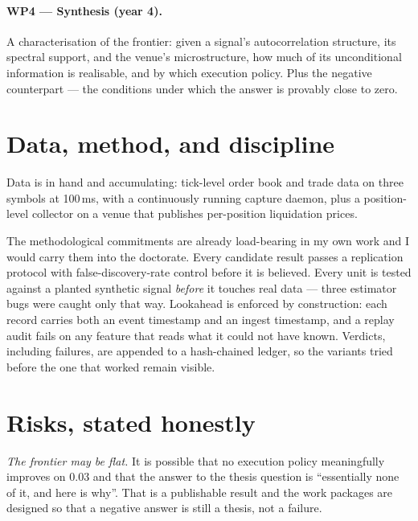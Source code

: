 \documentclass[11pt,a4paper]{article}
\begin{document}
\paragraph{WP4 --- Synthesis (year 4).} A characterisation of the frontier: given a signal's
autocorrelation structure, its spectral support, and the venue's microstructure, how much of its
unconditional information is realisable, and by which execution policy. Plus the negative
counterpart --- the conditions under which the answer is provably close to zero.

\section{Data, method, and discipline}

Data is in hand and accumulating: tick-level order book and trade data on three symbols at 100\,ms,
with a continuously running capture daemon, plus a position-level collector on a venue that publishes
per-position liquidation prices.

The methodological commitments are already load-bearing in my own work and I would carry them into
the doctorate. Every candidate result passes a replication protocol with false-discovery-rate
control before it is believed. Every unit is tested against a planted synthetic signal
\emph{before} it touches real data --- three estimator bugs were caught only that way. Lookahead is
enforced by construction: each record carries both an event timestamp and an ingest timestamp, and a
replay audit fails on any feature that reads what it could not have known. Verdicts, including
failures, are appended to a hash-chained ledger, so the variants tried before the one that worked
remain visible.

\section{Risks, stated honestly}

\emph{The frontier may be flat.} It is possible that no execution policy meaningfully improves on
$0.03$ and that the answer to the thesis question is ``essentially none of it, and here is why''.
That is a publishable result and the work packages are designed so that a negative answer is still
a thesis, not a failure.
\end{document}
